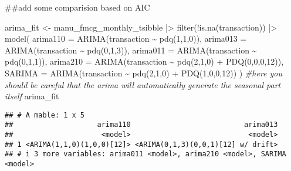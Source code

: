 \documentclass[
]{article}
\newenvironment{Shaded}{\begin{snugshade}}{\end{snugshade}}
\newcommand{\AttributeTok}[1]{\textcolor[rgb]{0.77,0.63,0.00}{#1}}
\newcommand{\CommentTok}[1]{\textcolor[rgb]{0.56,0.35,0.01}{\textit{#1}}}
\newcommand{\DecValTok}[1]{\textcolor[rgb]{0.00,0.00,0.81}{#1}}
\newcommand{\FunctionTok}[1]{\textcolor[rgb]{0.00,0.00,0.00}{#1}}
\newcommand{\NormalTok}[1]{#1}
\newcommand{\OtherTok}[1]{\textcolor[rgb]{0.56,0.35,0.01}{#1}}
\newcommand{\SpecialCharTok}[1]{\textcolor[rgb]{0.00,0.00,0.00}{#1}}
\begin{document}
\#\#add some comparision based on AIC

\begin{Shaded}
\begin{Highlighting}[]
\NormalTok{arima\_fit }\OtherTok{\textless{}{-}}\NormalTok{ manu\_fmcg\_monthly\_tsibble }\SpecialCharTok{|\textgreater{}} 
             \FunctionTok{filter}\NormalTok{(}\SpecialCharTok{!}\FunctionTok{is.na}\NormalTok{(transaction)) }\SpecialCharTok{|\textgreater{}} 
             \FunctionTok{model}\NormalTok{(}
                   \AttributeTok{arima110 =} \FunctionTok{ARIMA}\NormalTok{(transaction }\SpecialCharTok{\textasciitilde{}} \FunctionTok{pdq}\NormalTok{(}\DecValTok{1}\NormalTok{,}\DecValTok{1}\NormalTok{,}\DecValTok{0}\NormalTok{)),}
                   \AttributeTok{arima013 =} \FunctionTok{ARIMA}\NormalTok{(transaction }\SpecialCharTok{\textasciitilde{}} \FunctionTok{pdq}\NormalTok{(}\DecValTok{0}\NormalTok{,}\DecValTok{1}\NormalTok{,}\DecValTok{3}\NormalTok{)),}
                   \AttributeTok{arima011 =} \FunctionTok{ARIMA}\NormalTok{(transaction }\SpecialCharTok{\textasciitilde{}} \FunctionTok{pdq}\NormalTok{(}\DecValTok{0}\NormalTok{,}\DecValTok{1}\NormalTok{,}\DecValTok{1}\NormalTok{)),}
                   \AttributeTok{arima210 =} \FunctionTok{ARIMA}\NormalTok{(transaction }\SpecialCharTok{\textasciitilde{}} \FunctionTok{pdq}\NormalTok{(}\DecValTok{2}\NormalTok{,}\DecValTok{1}\NormalTok{,}\DecValTok{0}\NormalTok{) }\SpecialCharTok{+} \FunctionTok{PDQ}\NormalTok{(}\DecValTok{0}\NormalTok{,}\DecValTok{0}\NormalTok{,}\DecValTok{0}\NormalTok{,}\DecValTok{12}\NormalTok{)),}
                   \AttributeTok{SARIMA   =} \FunctionTok{ARIMA}\NormalTok{(transaction }\SpecialCharTok{\textasciitilde{}} \FunctionTok{pdq}\NormalTok{(}\DecValTok{2}\NormalTok{,}\DecValTok{1}\NormalTok{,}\DecValTok{0}\NormalTok{) }\SpecialCharTok{+} \FunctionTok{PDQ}\NormalTok{(}\DecValTok{1}\NormalTok{,}\DecValTok{0}\NormalTok{,}\DecValTok{0}\NormalTok{,}\DecValTok{12}\NormalTok{))}
\NormalTok{                   )}
\CommentTok{\#here you should be careful that the arima will automatically generate the seasonal part itself}
\NormalTok{arima\_fit}
\end{Highlighting}
\end{Shaded}

\begin{verbatim}
## # A mable: 1 x 5
##                    arima110                           arima013
##                     <model>                            <model>
## 1 <ARIMA(1,1,0)(1,0,0)[12]> <ARIMA(0,1,3)(0,0,1)[12] w/ drift>
## # i 3 more variables: arima011 <model>, arima210 <model>, SARIMA <model>
\end{verbatim}
\end{document}
